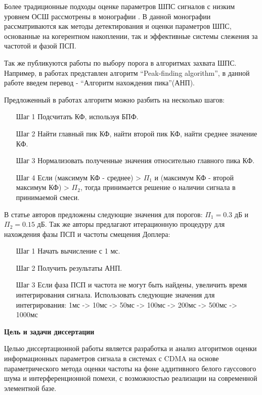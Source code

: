 Более традиционные подходы оценке параметров ШПС сигналов с низким уровнем ОСШ рассмотрены в монографии \cite{ziedan-book}.
В данной монографии рассматриваются как методы детектирования и оценки параметров ШПС, основанные на когерентном накоплении, так и эффективные
системы слежения за частотой и фазой ПСП.

Так же публикуются работы по выбору порога в алгоритмах захвата ШПС. Например, в работах \cite{2max_ieee, 2max_article} представлен алгоритм
\textquotedblleft{Peak-finding algorithm}\textquotedblright,
в данной работе введем перевод -
\textquotedblleft{Алгоритм нахождения пика}\textquotedblright (АНП). 

Предложенный в работах алгоритм можно разбить на несколько шагов:
\begin{itemize}
	\item[Шаг 1] Подсчитать КФ, используя БПФ.
	\item[Шаг 2] Найти главный пик КФ, найти второй пик КФ, найти среднее значение КФ.
	\item[Шаг 3] Нормализовать полученные значения относительно главного пика КФ.
	\item[Шаг 4] Если (максимум КФ - среднее) > ${\Pi_1}$ и (максимум КФ - 
		второй максимум КФ) > ${\Pi_2}$, тогда принимается решение о наличии сигнала в принимаемой смеси. 
\end{itemize}

В статье авторов \cite{2max_ieee} предложены следующие значения для порогов:
${\Pi_1} = 0.3$ дБ и  ${\Pi_2} = 0.15$ дБ. Так же авторы предлагают итерационную процедуру для нахождения фазы ПСП и частоты смещения Доплера:
\begin{itemize}
	\item[Шаг 1] Начать вычисление с 1 мс.
	\item[Шаг 2] Получить результаты АНП.
	\item[Шаг 3] Если фаза ПСП и частота не могут быть найдены, увеличить время интегрирования сигнала.
		Использовать следующие значения для интегрирования: 1мс -> 10мс -> 50мс -> 100мс -> 200мс -> 500мс -> 1000мс
\end{itemize}

{\bf{Цель и задачи диссертации}}

Целью диссертационной работы является разработка и анализ алгоритмов оценки информационных параметров сигнала в системах с CDMA на основе
параметрического метода оценки частоты на фоне аддитивного белого гауссового шума и интерференционной помехи,
с возможностью реализации на современной элементной базе.

